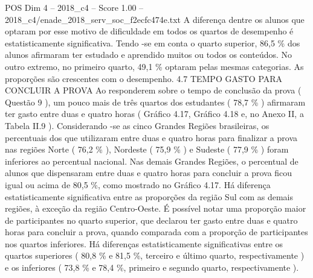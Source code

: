 \begin{textsample}{POS Dim 4 – 2018\_c4 – Score 1.00 – 2018\_c4/enade\_2018\_serv\_soc\_f2ecfc474e.txt}
A diferença dentre os alunos que optaram por esse motivo de dificuldade em todos os quartos de desempenho é estatisticamente significativa.
Tendo -se em conta o quarto superior, 86,5 \% dos alunos afirmaram ter estudado e aprendido muitos ou todos os conteúdos.
No outro extremo, no primeiro quarto, 49,1 \% optaram pelas mesmas categorias.
As proporções são crescentes com o desempenho. 4.7 TEMPO GASTO PARA CONCLUIR A PROVA Ao responderem sobre o tempo de conclusão da prova ( Questão 9 ), um pouco mais de três quartos dos estudantes ( 78,7 \% ) afirmaram ter gasto entre duas e quatro horas ( Gráfico 4.17, Gráfico 4.18 e, no Anexo II, a Tabela II.9 ).
Considerando -se as cinco Grandes Regiões brasileiras, os percentuais dos que utilizaram entre duas e quatro horas para finalizar a prova nas regiões Norte ( 76,2 \% ), Nordeste ( 75,9 \% ) e Sudeste ( 77,9 \% ) foram inferiores ao percentual nacional.
Nas demais Grandes Regiões, o percentual de alunos que dispensaram entre duas e quatro horas para concluir a prova ficou igual ou acima de 80,5 \%, como mostrado no Gráfico 4.17.
Há diferença estatisticamente significativa entre as proporções da região Sul com as demais regiões, à exceção da região Centro-Oeste.
É possível notar uma proporção maior de participantes no quarto superior, que declarou ter gasto entre duas e quatro horas para concluir a prova, quando comparada com a proporção de participantes nos quartos inferiores.
Há diferenças estatisticamente significativas entre os quartos superiores ( 80,8 \% e 81,5 \%, terceiro e último quarto, respectivamente ) e os inferiores ( 73,8 \% e 78,4 \%, primeiro e segundo quarto, respectivamente ).

\end{textsample}
